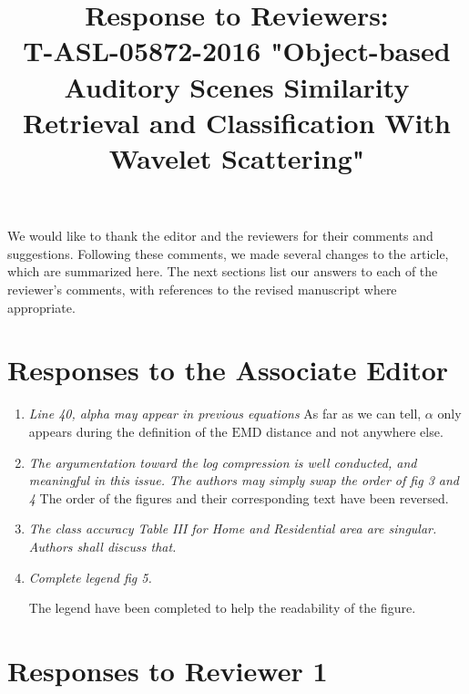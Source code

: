 \documentclass[10pt]{article}
\title{Response to Reviewers: \\ T-ASL-05872-2016 "Object-based Auditory Scenes Similarity Retrieval and Classification With Wavelet Scattering"}
\begin{document}
\maketitle

We would like to thank the editor and the reviewers for their comments and suggestions. Following these comments, we made several changes to the article, which are summarized here. The next sections list our answers to each of the reviewer's comments, with references to the revised manuscript where appropriate.

\section{Responses to the Associate Editor}

\begin{enumerate}

\item \emph{Line 40, alpha may appear in previous equations}
As far as we can tell, $\alpha$ only appears during the definition of the $\widehat{\mathrm{EMD}}$ distance and not anywhere else.

\item \emph{The argumentation toward the log compression is well conducted, and meaningful in this issue. The authors may simply swap the order of fig 3 and 4}
The order of the figures and their corresponding text have been reversed.

\item \emph{The class accuracy Table III for Home and Residential area are singular. Authors shall discuss that.}

\item \emph{Complete legend fig 5.}

The legend have been completed to help the readability of the figure.

\end{enumerate}

\section{Responses to Reviewer 1}
\end{document}
